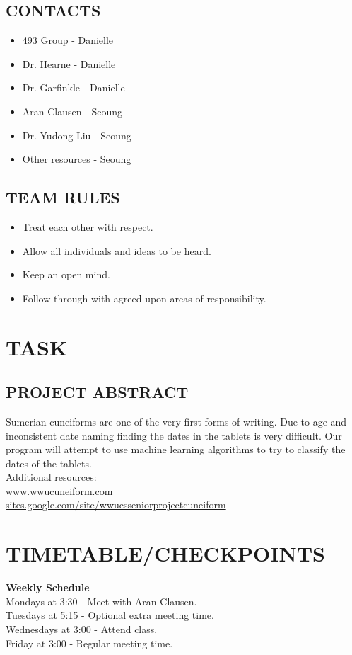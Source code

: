 \documentclass[11pt]{article}
\begin{document}
\subsection{CONTACTS}
\begin{itemize}
	\item 493 Group - Danielle
	\item Dr. Hearne - Danielle
	\item Dr. Garfinkle - Danielle
	\item Aran Clausen - Seoung
	\item Dr. Yudong Liu - Seoung
	\item Other resources - Seoung
\end{itemize}
    
\subsection{TEAM RULES}
\begin{itemize}
	\item Treat each other with respect.
	\item Allow all individuals and ideas to be heard.
	\item Keep an open mind.
	\item Follow through with agreed upon areas of responsibility.
\end{itemize}

\section{TASK}
\subsection{PROJECT ABSTRACT}
Sumerian cuneiforms are one of the very first forms of writing. Due to age and inconsistent date naming finding the dates in the tablets is very difficult. Our program will attempt to use machine learning algorithms to try to classify the dates of the tablets. \\
Additional resources: \\
\url{www.wwucuneiform.com} \\
\url{sites.google.com/site/wwucsseniorprojectcuneiform}

\section{TIMETABLE/CHECKPOINTS}
\textbf{Weekly Schedule}\\
Mondays at 3:30 - Meet with Aran Clausen.\\
Tuesdays at 5:15 - Optional extra meeting time.\\
Wednesdays at 3:00 - Attend class.\\
Friday at 3:00 - Regular meeting time.\\
\end{document}
